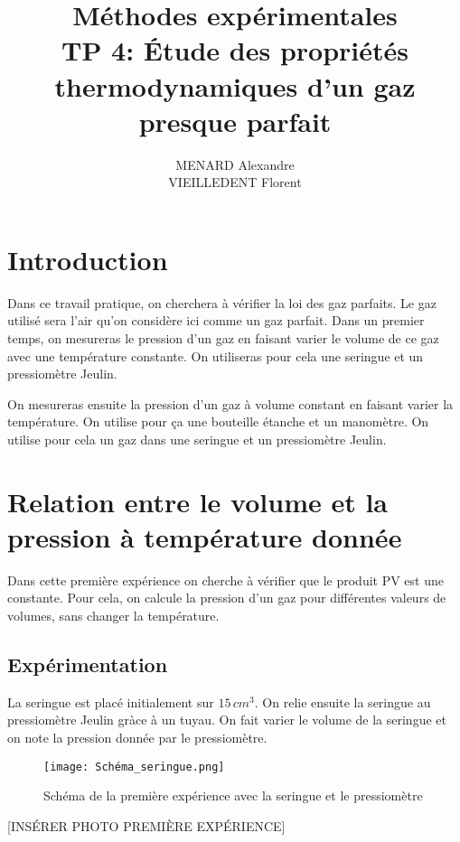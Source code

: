 \documentclass[12pt]{article}
\title{\textbf{Méthodes expérimentales} \\ TP 4: Étude des propriétés thermodynamiques d'un gaz presque parfait}
\author{MENARD Alexandre \\ VIEILLEDENT Florent}
\begin{document}
\maketitle

\section*{Introduction}
Dans ce travail pratique, on cherchera à vérifier la loi des gaz parfaits. Le gaz utilisé sera l'air qu'on considère ici comme un gaz parfait. Dans un premier temps, on mesureras le pression d'un gaz en faisant varier le volume de ce gaz avec une température constante. On utiliseras pour cela une seringue et un pressiomètre Jeulin. 

On mesureras ensuite la pression d'un gaz à volume constant en faisant varier la température. On utilise pour ça une bouteille étanche et un manomètre. On utilise pour cela un gaz dans une seringue et un pressiomètre Jeulin. 





\newpage

\section{Relation entre le volume et la pression à température donnée}

Dans cette première expérience on cherche à vérifier que le produit PV est une constante. Pour cela, on calcule la pression d'un gaz pour différentes valeurs de volumes, sans changer la température. 	

\subsection{Expérimentation}

La seringue est placé initialement sur $15\, cm^3$. On relie ensuite la seringue au pressiomètre Jeulin gràce à un tuyau. On fait varier le volume de la seringue et on note la pression donnée par le pressiomètre. 

\begin{figure}[!h]
	\begin{center}
		\texttt{[image: Schéma\_seringue.png]}
		\label{Schéma_seringue}
		\caption{Schéma de la première expérience avec la seringue et le pressiomètre}
	\end{center}
\end{figure}

[INSÉRER PHOTO PREMIÈRE EXPÉRIENCE]
\end{document}
